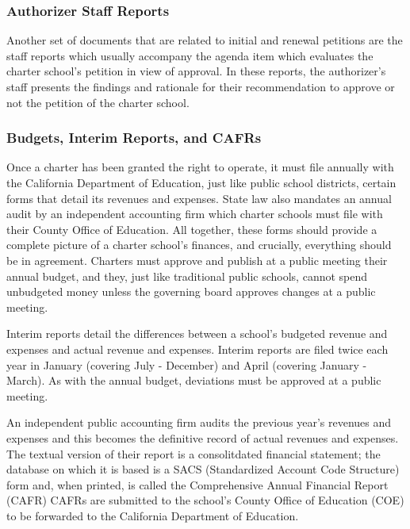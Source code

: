 \subsubsection{Authorizer Staff Reports}\label{sec:cs-staff-reports}%

Another set of documents that are related to initial and renewal petitions are the staff reports which usually accompany the agenda item which evaluates the charter school's petition in view of approval. In these reports, the authorizer's staff presents the findings and rationale for their recommendation to approve or not the petition of the charter school.

\subsubsection{Budgets,  Interim Reports, and CAFRs}\label{sec:budgets-etc}%

Once a charter has been granted the right to operate, it must file annually with the California Department of Education, just like public school districts, certain forms that detail its revenues and expenses. State law also mandates an annual audit by an independent accounting firm which charter schools must file with their County Office of Education. All together, these forms should provide a complete picture of a charter school's finances, and crucially, everything should be in agreement. Charters must approve and publish at a public meeting their annual budget, and they, just like traditional public schools, cannot spend unbudgeted money unless the governing board approves changes at a public meeting.

Interim reports detail the differences between a school's budgeted revenue and expenses and actual revenue and expenses. Interim reports are filed twice each year in January (covering July - December) and April (covering January - March). As with the annual budget, deviations must be approved at a public meeting.

An independent public accounting firm audits the previous year's revenues and expenses and this becomes the definitive record of actual revenues and expenses. The textual version of their report is a consolitdated financial statement; the database on which it is based is a SACS (Standardized Account Code Structure) form and, when printed, is called the Comprehensive Annual Financial Report (CAFR)  CAFRs are submitted to the school's County Office of Education (COE) to be forwarded to the California Department of Education. 

